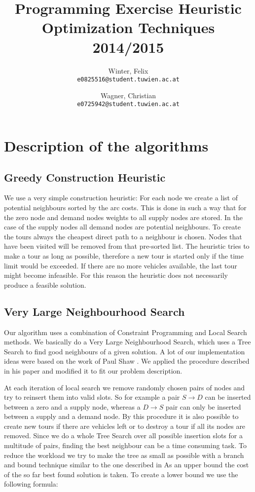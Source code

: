 \documentclass[a4paper]{scrartcl}
\author{
  Winter, Felix\\
  \texttt{e0825516@student.tuwien.ac.at}
  \and
  Wagner, Christian\\
  \texttt{e0725942@student.tuwien.ac.at}
}
\title{Programming Exercise Heuristic Optimization Techniques 2014/2015}
\begin{document}
\setlength{\abovedisplayskip}{0pt}
\setlength{\belowdisplayskip}{0pt}

\begingroup
 \makeatletter
 \maketitle
\endgroup

\section{Description of the algorithms}

\subsection{Greedy Construction Heuristic}

We use a very simple construction heuristic: For each node we create a list of potential neighbours sorted by the arc costs.
This is done in such a way that for the zero node and demand nodes weights to all supply nodes are stored. In the case of the supply
nodes all demand nodes are potential neighbours.
To create the tours always the cheapest direct path to a neighbour is chosen. Nodes that have been visited will be removed from that
pre-sorted list. The heuristic tries to make a tour as long as possible, therefore a new tour is started only if the time limit would be exceeded.
If there are no more vehicles available, the last tour might become infeasible. For this reason the heuristic does not necessarily
produce a feasible solution.
\subsection{Very Large Neighbourhood Search}

Our algorithm uses a combination of Constraint Programming and Local Search methods. We basically do a Very Large Neighbourhood Search, which uses a Tree Search to find good neighbours of a given solution.
A lot of our implementation ideas were based on the work of Paul Shaw \cite{shaw1998using}. We applied the procedure described in his paper and modified it to fit our problem description.

At each iteration of local search we remove randomly chosen pairs of nodes and try to reinsert them into valid slots. So for example a pair $S \rightarrow D$ can be inserted between a zero and a supply node, whereas a $D \rightarrow S$ pair can only be inserted between a supply and a demand node. By this procedure it is also possible to create new tours if there are vehicles left or to destroy a tour if all its nodes are removed. Since we do a whole Tree Search over all possible insertion slots for a multitude of pairs, finding the best neighbour can be a time consuming task. To reduce the workload we try to make the tree as small as possible with a branch and bound technique similar to the one described in \cite{shaw1998using}
As an upper bound the cost of the so far best found solution is taken. To create a lower bound we use the following formula:
\end{document}

